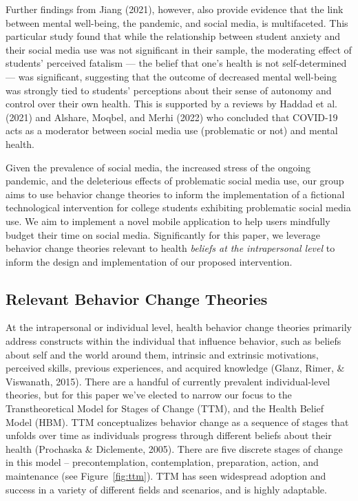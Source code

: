 \documentclass[
  man]{apa6}
\begin{document}
Further findings from Jiang (2021), however,
also provide evidence that the link between mental well-being, the pandemic, and social media,
is multifaceted. This particular study found that while the relationship
between student anxiety and their social media use was not significant in
their sample, the moderating effect of students' perceived fatalism --- the
belief that one's health is not self-determined --- was significant, suggesting
that the outcome of decreased mental well-being was strongly tied to students'
perceptions about their sense of autonomy and control over their own health.
This is supported by a reviews by Haddad et al. (2021) and
Alshare, Moqbel, and Merhi (2022) who concluded that
COVID-19 acts as a moderator between social media use (problematic or not) and
mental health.

Given the prevalence of social media, the increased stress of the ongoing
pandemic, and the deleterious effects of problematic
social media use, our group aims to use behavior change theories to inform the
implementation of a fictional technological intervention for college students
exhibiting problematic social media use. We aim to implement a novel mobile
application to help users mindfully budget their time on social media.
Significantly for this paper, we leverage behavior change theories
relevant to health \emph{beliefs at the intrapersonal level} to inform the design
and implementation of our proposed intervention.

\hypertarget{relevant-behavior-change-theories}{%
\subsection{Relevant Behavior Change Theories}\label{relevant-behavior-change-theories}}

At the intrapersonal or individual level, health behavior change theories primarily address
constructs within the individual that influence behavior, such as beliefs about self and the world around them,
intrinsic and extrinsic motivations, perceived skills, previous experiences, and acquired knowledge (Glanz, Rimer, \& Viswanath, 2015).
There are a handful of currently prevalent individual-level theories, but for
this paper we've elected to narrow our focus to the Transtheoretical Model for
Stages of Change (TTM), and the Health Belief Model (HBM). TTM
conceptualizes behavior change as a sequence of stages that
unfolds over time as individuals progress through different beliefs about their
health (Prochaska \& Diclemente, 2005). There are five discrete stages of change in this model --
precontemplation, contemplation, preparation, action, and maintenance (see Figure~\ref{fig:ttm}).
TTM has seen widespread adoption and success in a variety of different fields
and scenarios, and is highly adaptable.
\end{document}
